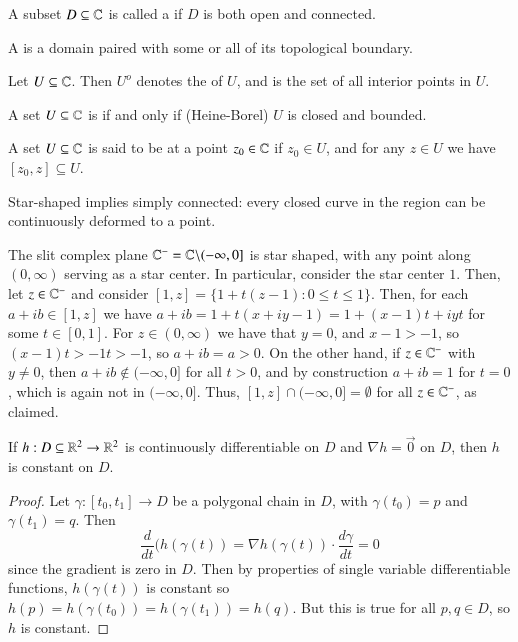 \documentclass[12pt, a4paper, oneside, openright, titlepage]{book}
\begin{document}
\begin{defn}
    A subset $D \subseteq \mathbb C$ is called a  if $D$ is both open and connected.
\end{defn}


\begin{defn}
    A  is a domain paired with some or all of its topological boundary.
\end{defn}

\begin{defn}
    Let $U \subseteq \mathbb C$. Then $U^o$ denotes the  of $U$, and is the set of all interior points in $U$.
\end{defn}

\begin{defn}
    A set $U \subseteq \mathbb C$ is  if and only if (Heine-Borel) $U$ is closed and bounded.
\end{defn}


\begin{defn}
    A set $U \subseteq \mathbb C$ is said to be  at a point $z_0 \in \mathbb C$ if $z_0 \in U$, and for any $z \in U$ we have $[z_0,z] \subseteq U$.
\end{defn}

Star-shaped implies simply connected: every closed curve in the region can be continuously deformed to a point.

\begin{eg}
    The slit complex plane $\mathbb C^- = \mathbb C\backslash(-\infty,0]$ is star shaped, with any point along $(0,\infty)$ serving as a star center. In particular, consider the star center $1$. Then, let $z \in \mathbb C^-$ and consider $[1,z] = \{1+t(z-1):0\leq t\leq 1\}$. Then, for each $a+ib \in [1,z]$ we have $a+ib = 1+t(x+iy-1) = 1+(x-1)t+iyt$ for some $t \in [0,1]$. For $z \in (0,\infty)$ we have that $y = 0$, and $x-1 > -1$, so $(x-1)t > -1t > -1$, so $a+ib = a > 0$. On the other hand, if $z \in \mathbb C^-$ with $y \neq 0$, then $a+ib \notin (-\infty,0]$ for all $t > 0$, and by construction $a+ib = 1$ for $t = 0$, which is again not in $(-\infty,0]$. Thus, $[1,z] \cap (-\infty,0] = \emptyset$ for all $z \in \mathbb C^-$, as claimed.
\end{eg}


\begin{thm}\label{thm:constant}
    If $h:D\subseteq \mathbb R^2\rightarrow\mathbb R^2$ is continuously differentiable on $D$ and $\nabla h= \vec{0}$ on $D$, then $h$ is constant on $D$.
\end{thm}
\begin{proof}
    Let $\gamma:[t_0,t_1]\rightarrow D$ be a polygonal chain in $D$, with $\gamma(t_0) = p$ and $\gamma(t_1) = q$. Then \begin{equation*}
        \frac{d}{dt}(h(\gamma(t)) = \nabla h(\gamma(t)) \cdot \frac{d\gamma}{dt} = 0
    \end{equation*}
    since the gradient is zero in $D$. Then by properties of single variable differentiable functions, $h(\gamma(t))$ is constant so $h(p) = h(\gamma(t_0)) = h(\gamma(t_1)) = h(q)$. But this is true for all $p,q \in D$, so $h$ is constant.
\end{proof}
\end{document}

